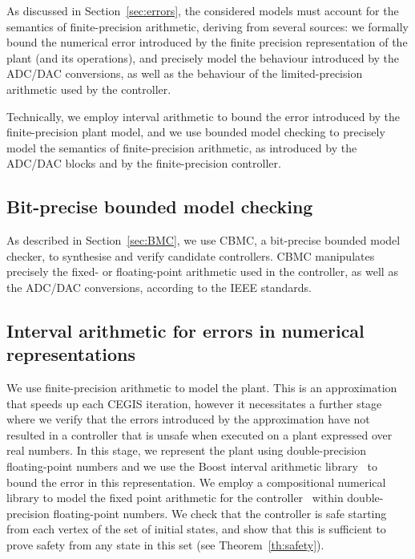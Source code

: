 As discussed in Section~\ref{sec:errors}, 
the considered models must account for the semantics of finite-precision arithmetic, 
deriving from several sources: 
we formally bound the numerical error introduced by the finite precision representation of the plant (and its operations), 
and precisely model the behaviour introduced by the ADC/DAC conversions, 
as well as the behaviour of the limited-precision arithmetic used by the controller. 

Technically, we employ interval arithmetic to bound the error introduced by the finite-precision plant model, 
and we use bounded model checking to precisely model the semantics of finite-precision arithmetic, 
as introduced by the ADC/DAC blocks and by the finite-precision controller. 

\subsection{Bit-precise bounded model checking} 

As described in Section~\ref{sec:BMC}, we use CBMC, a bit-precise bounded model checker, 
to synthesise and verify candidate controllers. 
CBMC manipulates precisely the fixed- or floating-point arithmetic used in the controller, 
as well as the ADC/DAC conversions, according to the IEEE standards. 

\subsection{Interval arithmetic for errors in numerical representations}  

We use finite-precision arithmetic to model the plant. 
This is an approximation that speeds up each CEGIS iteration, 
however it necessitates a further stage where we verify that the errors introduced by the approximation have not resulted in a controller that is unsafe when executed on a plant expressed over real numbers.  
In this stage, we represent the plant using double-precision floating-point numbers 
and we use the Boost interval arithmetic library~\cite{DBLP:journals/tcs/BronnimannMP06} to bound the error in this representation. 
We employ a compositional numerical library to model the fixed point arithmetic for the controller~\cite{CNL} within double-precision floating-point numbers. 
We check that the controller is safe starting from each vertex of the set of initial states,  
and show that this is sufficient to prove safety from any state in this set (see Theorem~\ref{th:safety}). %

